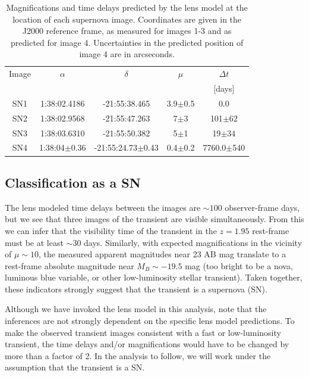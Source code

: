 \documentclass[12pt,dvipsnames]{article}
\begin{document}
\begin{table}[]
    \centering
    \begin{tabular}{c|c|c|c|c|}
    Image     & $\alpha$ & $\delta$ & $\mu$ & $\Delta t$ \\
    & & & & [days] \\
\hline 
SN1 & 1:38:02.4186     & -21:55:38.465         & 3.9$\pm$0.5   &   0.0 \\
SN2 & 1:38:02.9568     & -21:55:47.263         & 7$\pm$3     & 101$\pm62$ \\
SN3 & 1:38:03.6310     & -21:55:50.382         & 5$\pm$1     &  19$\pm34$\\
SN4 & 1:38:04$\pm$0.36 & -21:55:24.73$\pm$0.43 & 0.4$\pm$0.2 & 7760.0$\pm$540\\
\hline 
\end{tabular}
    \caption{Magnifications and time delays predicted by the lens model at the location of each supernova image. Coordinates are given in the J2000 reference frame, as measured for images 1-3 and as predicted for image 4. Uncertainties in the predicted position of image 4 are in arcseconds.}
    \label{tab:snpred}
\end{table}


\subsection*{Classification as a SN}
The lens modeled time delays between the images are $\sim100$ observer-frame days, 
but we see that three images of the transient are visible simultaneously.
From this we can infer that the visibility time of the transient in the $z=1.95$ rest-frame must be at least $\sim$30 days. 
Similarly, with expected magnifications in the vicinity of $\mu\sim10$, the measured apparent magnitudes near 23 AB mag translate to a rest-frame absolute magnitude near $M_B \sim-19.5$ mag (too bright to be a nova, luminous blue variable, or other low-luminosity stellar transient).
Taken together, these indicators strongly suggest that the transient is a supernova (SN). 

Although we have invoked the lens model in this analysis, note that the inferences are not strongly dependent on the specific lens model predictions.  To make the observed transient images consistent with a fast or low-luminosity transient, the time delays and/or magnifications would have to be changed by more than a factor of 2.  In the analysis to follow, we will work under the assumption that the transient is a SN. 
\end{document}
